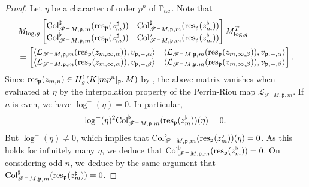 \documentclass{amsart}
\numberwithin{equation}{section}
\newcommand{\frk}{\mathfrak}
\newcommand{\col}{\mathrm{Col}}
\newcommand{\ac}{\textup{ac}}
\newcommand{\res}{\textup{res}}
\begin{document}
\begin{proof}
Let $\eta$ be a character of order $p^n$ of $\Gamma_\ac$. Note that %
\begin{align*}
&M_{\log,g}\begin{bmatrix}
     \col^\sharp_{\mathscr{F}^-M,\frk{p},m}(\res_{\frk{p}}(z_m^\sharp)) & \col^\sharp_{\mathscr{F}^-M,\frk{p},m}(\res_{\frk{p}}(z_m^\flat)) \\
      \col^\flat_{\mathscr{F}^-M,\frk{p},m}(\res_{\frk{p}}(z_m^\sharp)) & \col^\flat_{\mathscr{F}^-M,\frk{p},m}(\res_{\frk{p}}(z_m^\flat)) 
\end{bmatrix}M_{\log,g}^T \\
&= \begin{bmatrix}
    \langle \mathcal{L}_{\mathscr{F}^-M,\frk{p},m}(\res_{\frk{p}}(z_{m,\infty,\alpha})),v_{\frk{p},-,\alpha} \rangle & \langle \mathcal{L}_{\mathscr{F}^-M,\frk{p},m}(\res_{\frk{p}}(z_{m,\infty,\beta})),v_{\frk{p},-,\alpha} \rangle \\
    \langle \mathcal{L}_{\mathscr{F}^-M,\frk{p},m}(\res_{\frk{p}}(z_{m,\infty,\alpha})),v_{\frk{p},-,\beta} \rangle & \langle \mathcal{L}_{\mathscr{F}^-M,\frk{p},m}(\res_{\frk{p}}(z_{m,\infty,\beta})),v_{\frk{p},-,\beta} \rangle
\end{bmatrix}.
\end{align*}
Since $\res_{\frk{p}}(z_{m,n})\in H^1_g(K[mp^n]_{\frk{p}},M)$ by \cite[Thm.~5.9]{NN16}, the above matrix vanishes when evaluated at $\eta$ by the interpolation property of the Perrin-Riou map $\mathcal{L}_{\mathscr{F}^-M,\frk{p},m}$. If $n$ is even, we have $\log^-(\eta)=0$. In particular, 
\[
\log^+(\eta)^2\col^\flat_{\mathscr{F}^-M,\frk{p},m}(\res_{\frk{p}}(z_m^\flat)) (\eta)=0.
\]
But $\log^+(\eta)\ne0$, which implies that $\col^\flat_{\mathscr{F}^-M,\frk{p},m}(\res_{\frk{p}}(z_m^\flat)) (\eta)=0$. As this holds for infinitely many $\eta$, we deduce that $\col^\flat_{\mathscr{F}^-M,\frk{p},m}(\res_{\frk{p}}(z_m^\flat))=0$. On considering odd $n$, we deduce by the same argument that $\col^\sharp_{\mathscr{F}^-M,\frk{p},m}(\res_{\frk{p}}(z_m^\sharp))=0$.
\end{proof}
\end{document}
